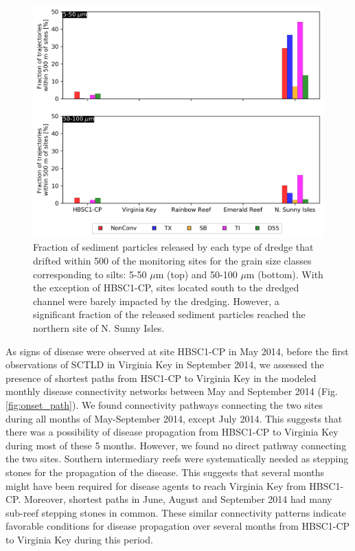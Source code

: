 \documentclass[preprint,12pt,authoryear]{elsarticle}
\begin{document}
\begin{figure}
    \centering
    \includegraphics[width=\textwidth]{figures/aggregated_silts.png}
    \caption{Fraction of sediment particles released by each type of dredge that drifted within 500 of the monitoring sites for the grain size classes corresponding to silts: 5-50 $\mu$m (top) and 50-100 $\mu$m (bottom). With the exception of HBSC1-CP, sites located south to the dredged channel were barely impacted by the dredging. However, a significant fraction of the released sediment particles reached the northern site of N. Sunny Isles.}
    \label{fig:onset_bar}
\end{figure}

As signs of disease were observed at site HBSC1-CP in May 2014, before the first observations of SCTLD in Virginia Key in September 2014, we assessed the presence of shortest paths from HSC1-CP to Virginia Key in the modeled monthly disease connectivity networks between May and September 2014 (Fig. \ref{fig:onset_path}). We found connectivity pathways connecting the two sites during all months of May-September 2014, except July 2014. This suggests that there was a possibility of disease propagation from HBSC1-CP to Virginia Key during most of these 5 months. However, we found no direct pathway connecting the two sites. Southern intermediary reefs were systematically needed as stepping stones for the propagation of the disease. This suggests that several months might have been required for disease agents to reach Virginia Key from HBSC1-CP. Moreover, shortest paths in June, August and September 2014 had many sub-reef stepping stones in common. These similar connectivity patterns indicate favorable conditions for disease propagation over several months from HBSC1-CP to Virginia Key during this period.  
\end{document}
